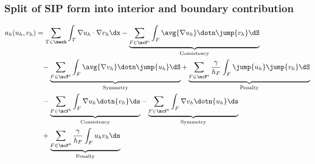 \begin{frame}
  \frametitle{Split of SIP form into interior and boundary
  contribution}
  \vspace{-2em}
  \begin{center}
    \begin{align*}
      a_h(u_h,v_h)
      &=
      \sum_{T\in \mesh} \int_{T} \nabla u_h \cdot \nabla v_h \dx
      -\underbrace{
        \sum_{F \in \mcF^i} \int_{F}\avg{\nabla u_h}\dotn \jump{v_h}  \dS
      }_{\text{Consistency}}
      \\
        &\phantom{=}
        - \underbrace{
          \sum_{F \in \mcF^i} \int_{F}\avg{\nabla v_h}\dotn \jump{u_h} \dS
        }_{\text{Symmetry}}
        + \underbrace{
          \sum_{F \in \mcF^i} \frac{\gamma}{h_F} \int_{F}\jump{u_h}
          \jump{v_h}  \dS
        }_{\text{Penalty}}
      \\
        &\phantom{=}
      -\underbrace{
        \sum_{F \in \mcF^b} \int_{F}{\nabla u_h}\dotn {v_h}  \ds
      }_{\text{Consistency}}
        - \underbrace{
          \sum_{F \in \mcF^b} \int_{F}{\nabla v_h}\dotn {u_h} \ds
        }_{\text{Symmetry}}
      \\
        &\phantom{=}
        + \underbrace{
          \sum_{F \in \mcF^b} \frac{\gamma}{h_F} \int_{F}{u_h}
          {v_h}  \ds
        }_{\text{Penalty}}
    \end{align*}
  \end{center}
\end{frame}
